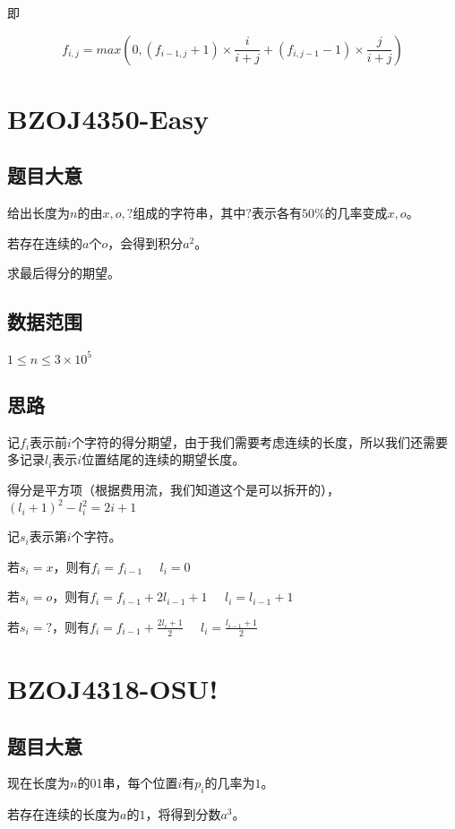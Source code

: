 \documentclass{ctexart}
\numberwithin{equation}{section}
\begin{document}
\begin{flushleft}
  即

  $$f_{i,j}=max(0, (f_{i-1,j}+1)\times \frac{i}{i+j}+(f_{i,j-1}-1)\times \frac{j}{i+j})$$

  \newpage

  \section{BZOJ4350-Easy}
  \subsection{题目大意}
  给出长度为$n$的由$x,o,?$组成的字符串，其中$?$表示各有$50\%$的几率变成$x,o$。

  若存在连续的$a$个$o$，会得到积分$a^2$。

  求最后得分的期望。

  \subsection{数据范围}
  $1\le n \le 3\times 10^5$
  \subsection{思路}
  
  记$f_i$表示前$i$个字符的得分期望，由于我们需要考虑连续的长度，所以我们还需要多记录$l_i$表示$i$位置结尾的连续的期望长度。

  得分是平方项（根据费用流，我们知道这个是可以拆开的），$(l_i+1)^2-l_i^2=2i+1$

  记$s_i$表示第$i$个字符。

  若$s_i=x$，则有$f_i=f_{i-1}\;\;\;\;\;l_i=0$

  若$s_i=o$，则有$f_i=f_{i-1}+2l_{i-1}+1\;\;\;\;\;l_i=l_{i-1}+1$

  若$s_i=?$，则有$f_i=f_{i-1}+\frac{2l_i+1}{2}\;\;\;\;\;l_i=\frac{l_{i-1}+1}{2}$
  \newpage

  \section{BZOJ4318-OSU!}
  \subsection{题目大意}
  现在长度为$n$的01串，每个位置$i$有$p_i$的几率为$1$。

  若存在连续的长度为$a$的$1$，将得到分数$a^3$。


\end{flushleft}
\end{document}
